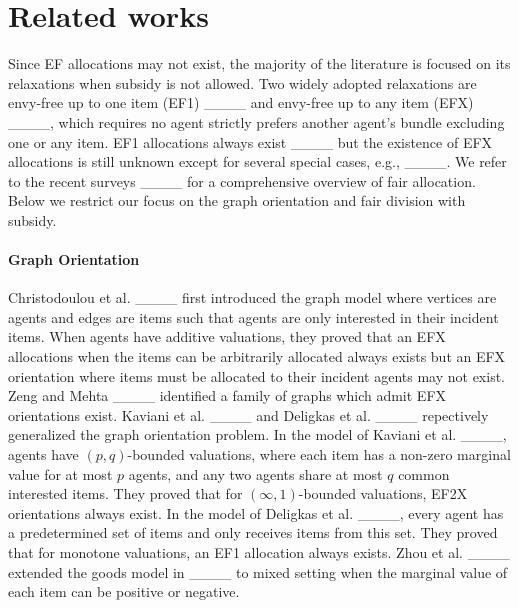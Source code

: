 \section{Related works}
Since EF allocations may not exist, the majority of the literature is focused on its relaxations when subsidy is not allowed. Two widely adopted relaxations are envy-free up to one item (EF1) ____ and envy-free up to any item (EFX) ____, which requires no agent strictly prefers another agent's bundle excluding one or any item.
EF1 allocations always exist ____ but the existence of EFX allocations is still unknown except for several special cases, e.g., ____. 
We refer to the recent surveys ____ for a comprehensive overview of fair allocation.
Below we restrict our focus on the graph orientation and fair division with subsidy.

\paragraph{Graph Orientation}
Christodoulou et al. ____ first introduced the graph model where vertices are agents and edges are items such that agents are only interested in their incident items.
When agents have additive valuations, they proved that an EFX allocations when the items can be arbitrarily allocated always exists but an EFX orientation where items must be allocated to their incident agents may not exist.
Zeng and Mehta ____ identified a family of graphs which admit EFX orientations exist. 
Kaviani et al. ____ and Deligkas et al. ____ 
repectively generalized the graph orientation problem.
In the model of Kaviani et al. ____, agents have $(p,q)$-bounded valuations, where each item has a non-zero marginal value for at most $p$ agents, and any two agents share at most $q$ common interested items. 
They proved that for $(\infty,1)$-bounded valuations, EF2X orientations always exist.
In the model of Deligkas et al. ____, every agent has a predetermined set of items and only receives items from this set. They proved that for monotone valuations, an EF1 allocation always exists. 
Zhou et al. ____ extended the goods model in ____ to mixed setting when the marginal value of each item can be positive or negative.





